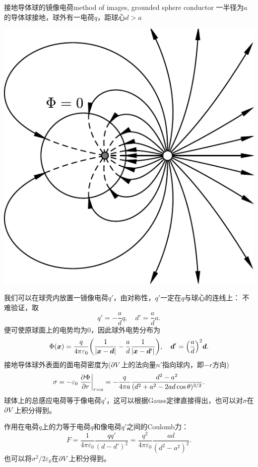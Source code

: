 \begin{example}{接地导体球的镜像电荷}{method of images, grounded sphere conductor}
    一半径为$a$的导体球接地，球外有一电荷$q$，距球心$d>a$
    \begin{center}
        \includegraphics[width=0.45\linewidth]{figures/image_charge_sphere.pdf}
        \label{fig:image charge of sphere}
    \end{center}
    我们可以在球壳内放置一镜像电荷$q'$，由对称性，$q'$一定在$q$与球心的连线上：
    不难验证，取
    \begin{equation}
        \label{eqn:image charge of sphere}
        q'=-\frac adq,\quad d'=\frac ada.
    \end{equation}
    便可使原球面上的电势均为0，因此球外电势分布为
    \begin{equation}
        \Phi(\bm x)=\frac q{4\pi\varepsilon_0}\biggl(\frac1{|\bm x-\bm d|}-\frac ad\frac1{|\bm x-\bm d'|}\biggr),\quad\bm d'=\Bigl(\frac ad\Bigr)^2\bm d.
    \end{equation}
    \tcblower
    接地导体球外表面的面电荷密度为($\partial V$上的法向量$n'$指向球内，即$-r$方向)
    \begin{equation}
        \label{eqn:grounded sphere conductor-point, sigma}
        \sigma=-\varepsilon_0\left.\frac{\partial^{{}}\Phi}{\partial{r}^{{}}}\right\rvert_{r=a}=-\frac q{4\pi a}\frac{d^2-a^2}{(d^2+a^2-2ad\cos\theta)^{3/2}}.
    \end{equation}
    球体上的总感应电荷等于像电荷$q'$，这可以根据Gauss定律直接得出，也可以对$\sigma$在$\partial V$上积分得到。

    作用在电荷$q$上的力等于电荷$q$和像电荷$q'$之间的Coulomb力：
    \begin{equation}
        \label{eqn:grounded sphere conductor-point, F}
        F=\frac1{4\pi\varepsilon_0}\frac{qq'}{(d-d')^2}=\frac{q^2}{4\pi\varepsilon_0}\frac{ad}{(d^2-a^2)^2}.
    \end{equation}
    也可以将$\sigma^2/2\varepsilon_0$在$\partial V$上积分得到。
\end{example}

